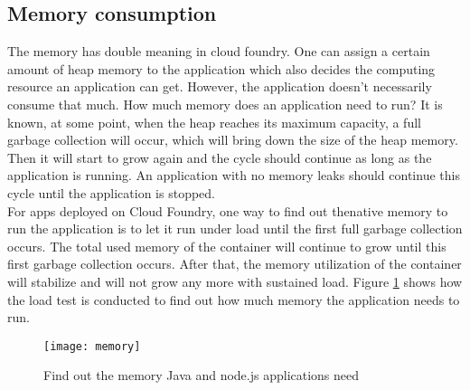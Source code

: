 \subsection{Memory consumption}
The memory has double meaning in cloud foundry. One can assign a certain amount of heap memory to the application which also decides the computing resource an application can get. However, the application doesn't necessarily consume that much. How much memory does an application need to run? It is known, at some point, when the heap reaches its maximum capacity, a full garbage collection will occur, which will bring down the size of the heap memory. Then it will start to grow again and the cycle should continue as long as the application is running. An application with no memory leaks should continue this cycle until the application is stopped. \\
For apps deployed on Cloud Foundry, one way to find out thenative memory to run the application is to let it run under load until the first full garbage collection occurs. The total used memory of the container will continue to grow until this first garbage collection occurs. After that, the memory utilization of the container will stabilize and will not grow any more with sustained load. Figure \ref{memory} shows how the load test is conducted to find out how much memory the application needs to run. 

\begin{figure}[h]
	\centering
	\texttt{[image: memory]}
	\caption{Find out the memory Java and node.js applications need }
	\label{memory}
\end{figure}

